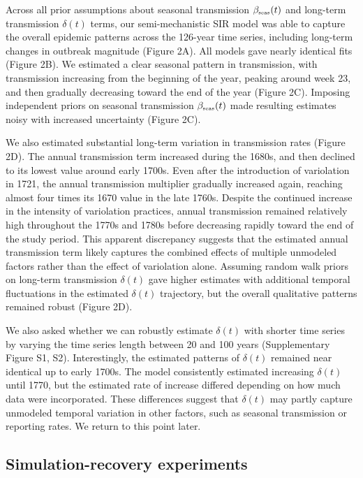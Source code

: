 \documentclass[12pt]{article}
\newcommand{\tsub}[2]{#1_{{\textrm{\tiny #2}}}}
\begin{document}
Across all prior assumptions about seasonal transmission $\tsub{\beta}{seas}(t)$ and long-term transmission $\delta(t)$ terms, 
our semi-mechanistic SIR model was able to capture the overall epidemic patterns across the 126-year time series, including long-term changes in outbreak magnitude (Figure 2A).
All models gave nearly identical fits (Figure 2B).
We estimated a clear seasonal pattern in transmission, with transmission increasing from the beginning of the year, peaking around week 23, and then gradually decreasing toward the end of the year (Figure 2C).
Imposing independent priors on seasonal transmission $\tsub{\beta}{seas}(t)$ made resulting estimates noisy with increased uncertainty (Figure 2C).

We also estimated substantial long-term variation in transmission rates (Figure 2D).
The annual transmission term increased during the 1680s, and then declined to its lowest value around early 1700s.
Even after the introduction of variolation in 1721, the annual transmission multiplier gradually increased again, reaching almost four times its 1670 value in the late 1760s.
Despite the continued increase in the intensity of variolation practices, annual transmission remained relatively high throughout the 1770s and 1780s before decreasing rapidly toward the end of the study period.
This apparent discrepancy suggests that the estimated annual transmission term likely captures the combined effects of multiple unmodeled factors rather than the effect of variolation alone.
Assuming random walk priors on long-term transmission $\delta(t)$ gave higher estimates with additional temporal fluctuations in the estimated $\delta(t)$ trajectory, but the overall qualitative patterns remained robust (Figure 2D).

We also asked whether we can robustly estimate $\delta(t)$ with shorter time series by varying the time series length between 20 and 100 years (Supplementary Figure S1, S2).
Interestingly, the estimated patterns of $\delta(t)$ remained near identical up to early 1700s.
The model consistently estimated increasing $\delta(t)$ until 1770, but the estimated rate of increase differed depending on how much data were incorporated.
These differences suggest that $\delta(t)$ may partly capture unmodeled temporal variation in other factors, such as seasonal transmission or reporting rates.
We return to this point later.

\subsection*{Simulation-recovery experiments}
\end{document}
